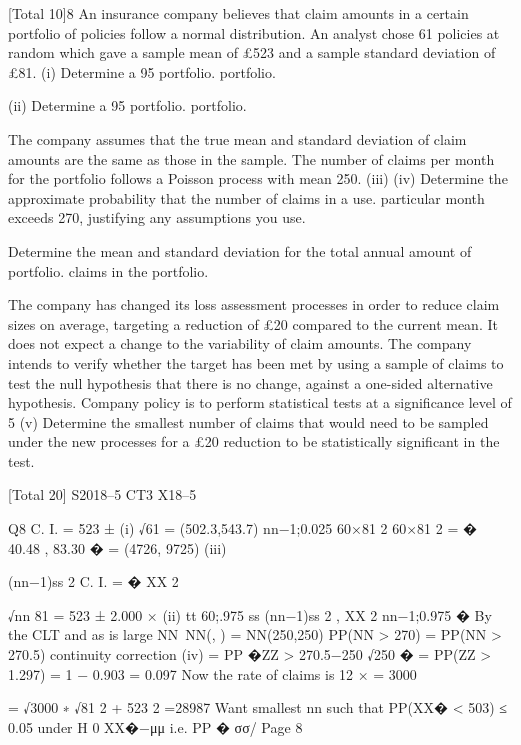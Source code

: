 [Total 10]8
An insurance company believes that claim amounts in a certain portfolio of policies
follow a normal distribution. An analyst chose 61 policies at random which gave a
sample mean of £523 and a sample standard deviation of £81.
(i) Determine a 95%
portfolio.
portfolio.

(ii) Determine a 95%
portfolio.
portfolio.

The company assumes that the true mean and standard deviation of claim amounts are
the same as those in the sample.
The number of claims per month for the portfolio follows a Poisson process with
mean 250.
(iii)
(iv)
Determine the approximate probability that the number of claims in a
use.
particular month exceeds 270, justifying any assumptions you use.

Determine the mean and standard deviation for the total annual amount of
portfolio.
claims in the portfolio.

The company has changed its loss assessment processes in order to reduce claim sizes
on average, targeting a reduction of £20 compared to the current mean. It does not
expect a change to the variability of claim amounts. The company intends to verify
whether the target has been met by using a sample of claims to test the null hypothesis
that there is no change, against a one-sided alternative hypothesis. Company policy is
to perform statistical tests at a significance level of 5%
(v)
Determine the smallest number of claims that would need to be sampled under
the new processes for a £20 reduction to be statistically significant in the test.



[Total 20]
S2018–5 
CT3 X18–5

Q8
C. I. = 523 ±
(i)
√61
= (502.3,543.7)
nn−1;0.025
60×81 2 60×81 2
= � 40.48 , 83.30 �
= (4726, 9725)
(iii)


(nn−1)ss 2
C. I. = � ΧΧ 2

√nn
81
= 523 ± 2.000 ×
(ii)
tt 60;.975 ss
(nn−1)ss 2
, ΧΧ 2
nn−1;0.975
�
By the CLT and as \lambda\lambda is large NN~NN(\lambda\lambda, \lambda\lambda) = NN(250,250)
PP(NN > 270) = PP(NN > 270.5) continuity correction
(iv)
= PP �ZZ >
270.5−250
√250
� = PP(ZZ > 1.297) = 1 − 0.903 = 0.097
Now the rate of claims is 12 × \lambda\lambda = 3000





= √3000 ∗ √81 2 + 523 2 =28987 
Want smallest nn such that PP(XX� < 503) ≤ 0.05 under H 0
XX�−μμ
i.e. PP � σσ/
Page 8


